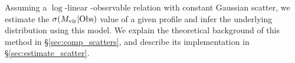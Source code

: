 \documentclass[fleqn,usenatbib,useAMS,english]{mnras}
\begin{document}
    Assuming a $\log$-linear \mvir{}-observable relation with constant Gaussian scatter,
    we estimate the $\sigma(M_{\rm vir} | {\rm Obs})$ value of a given \dsigma{} profile and
    infer the underlying \mvir{} distribution using this model.
    We explain the theoretical background of this method in \S \ref{sec:comp_scatters}, and
    describe its implementation in \S \ref{sec:estimate_scatter}.

\end{document}
